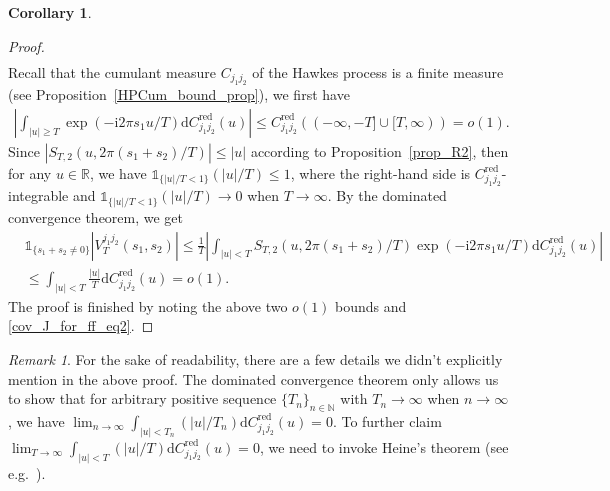 \documentclass[11pt]{article}
\numberwithin{equation}{section}
\theoremstyle{plain}
\theoremstyle{definition}
\theoremstyle{definition}
\theoremstyle{assumption}
\theoremstyle{proposition}
\theoremstyle{proposition}
\newtheorem{corollary}{Corollary}[section]
\theoremstyle{example}
\theoremstyle{lemma}
\theoremstyle{theorem}
\theoremstyle{remark}
\newtheorem*{remark}{Remark}
\begin{document}
\begin{corollary}
\begin{proof}
\begin{align*}
\end{align*}
Recall that the cumulant measure $C_{j_1 j_2}$ of the Hawkes process is a finite measure (see Proposition~\ref{HPCum_bound_prop}), we first have
\begin{align*}
\left|\int_{|u|\geqslant T} \exp(-\mathrm{i}2\pi s_1 u/T)\mathrm{d}C_{j_1j_2}^{\mathrm{red}}(u)\right|
\leqslant C_{j_1j_2}^{\mathrm{red}}((-\infty, -T] \cup[T, \infty))
=o(1) .
\end{align*}
Since $|S_{T,2}(u,2\pi(s_1+s_2)/T)|\leqslant |u|$ according to Proposition~\ref{prop_R2}, then for any $u\in \mathbb{R}$, we have $\mathds{1}_{\{|u|/T<1\}}(|u|/T) \leqslant 1$, where the right-hand side is $C_{j_1j_2}^{\mathrm{red}}$-integrable and $\mathds{1}_{\{|u|/T<1\}}(|u|/T) \rightarrow 0$ when $T\rightarrow\infty$. By the dominated convergence theorem, we get
\begin{align*}
&\mathds{1}_{\{s_1 + s_2 \neq 0\}}|V_{T}^{j_1 j_2}(s_1,s_2)|\leqslant\frac{1}{T}\left|\int_{|u|< T} S_{T,2}(u, 2\pi(s_1+s_2)/T) \exp(-\mathrm{i}2\pi s_1 u/T)\mathrm{d}C_{j_1j_2}^{\mathrm{red}}(u)\right| \\
&\leqslant \int_{|u|< T} \frac{|u|}{T} \mathrm{d}C_{j_1j_2}^{\mathrm{red}}(u)
=o(1).
\end{align*}
The proof is finished by noting the above two $o(1)$ bounds and \eqref{cov_J_for_ff_eq2}. 

\end{proof}
\end{corollary}

\begin{remark}
For the sake of readability, there are a few details we didn't explicitly mention in the above proof. The dominated convergence theorem only allows us to show that for arbitrary positive sequence $\{T_n\}_{n\in\mathbb{N}}$ with $T_n\rightarrow\infty$ when $n\rightarrow\infty$, we have $\lim_{n\rightarrow\infty}\int_{|u|< T_n} (|u|/T_n) \mathrm{d}C_{j_1j_2}^{\mathrm{red}}(u)= 0$. To further claim $\lim_{T\rightarrow\infty}\int_{|u|< T} (|u|/T) \mathrm{d}C_{j_1j_2}^{\mathrm{red}}(u)= 0$, we need to invoke Heine's theorem (see e.g.~\citet[Proposition 1, Section 3.2.1]{Zorich2015}).
\end{remark}
    
\end{document}
